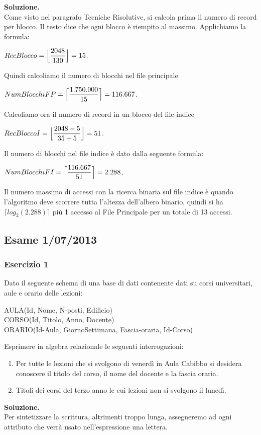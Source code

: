 \noindent\textbf{\fontsize{14pt}{1em}Soluzione.}\\
Come visto nel paragrafo Tecniche Risolutive, si calcola prima il numero di record per blocco. Il testo dice che 
ogni blocco è riempito al massimo. Applichiamo la formula:
\begin{center}
 $RecBlocco = \Bigl\lfloor \dfrac{2048}{130} \Bigr\rfloor = 15$.\\
\end{center}
Quindi calcoliamo il numero di blocchi nel file principale
\begin{center}
 $NumBlocchiFP = \Bigl\lceil \dfrac{1.750.000}{15} \Bigr\rceil = 116.667$.\\
\end{center}
Calcoliamo ora il numero di record in un blocco del file indice
\begin{center}
 $RecBloccoI = \Bigl\lfloor \dfrac{2048-5}{35+5} \Bigr\rfloor = 51$.\\
\end{center}
Il numero di blocchi nel file indice è dato dalla seguente formula:
\begin{center}
  $NumBlocchiFI= \Bigl\lceil \dfrac{116.667}{51} \Bigr\rceil = 2.288$.\\
\end{center}
Il numero massimo di accessi con la ricerca binaria sul file indice è quando l'algoritmo deve scorrere tutta l'altezza
dell'albero binario, quindi si ha $\lceil log_2(2.288)\rceil$ più 1 accesso al File Principale per un totale di 13 accessi.

 
\subsection{Esame 1/07/2013}
  \subsubsection{Esercizio 1}
  Dato il seguente schema di una base di dati contenente dati su corsi universitari, aule e orario delle lezioni:
  \begin{center}
  AULA(Id, Nome, N-posti, Edificio)\\
  CORSO(Id, Titolo, Anno, Docente)\\ 
  ORARIO(Id-Aula, GiornoSettimana, Fascia-oraria, Id-Corso)\\
  \end{center}

  Esprimere in algebra relazionale le seguenti interrogazioni:
  \begin{enumerate}
   \item Per tutte le lezioni che si svolgono di venerdì in Aula Cabibbo si desidera conoscere il titolo del corso,
   il nome del docente e la fascia oraria.
   \item Titoli dei  corsi del terzo anno le cui lezioni non si svolgono il lunedì. 
  \end{enumerate}
  \noindent\textbf{\fontsize{14pt}{1em}Soluzione.}\\
  Per sintetizzare la scrittura, altrimenti troppo lunga, assegneremo ad ogni attributo che verrà usato
  nell'espressione una lettera.
  
